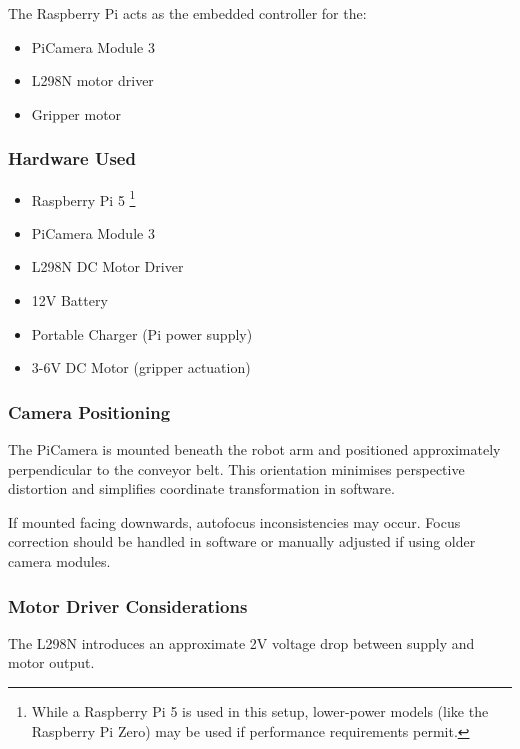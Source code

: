 \documentclass{ol-softwaremanual}
\begin{document}
The Raspberry Pi acts as the embedded controller for the:
\begin{itemize}
    \item PiCamera Module 3
    \item L298N motor driver
    \item Gripper motor
\end{itemize}

\subsubsection{Hardware Used}

\begin{itemize}
    \item Raspberry Pi 5
        \footnote{While a Raspberry Pi 5 is used in this setup, lower-power models (like the Raspberry Pi Zero) may be used if performance requirements permit.}
    \item PiCamera Module 3
    \item L298N DC Motor Driver
    \item 12V Battery
    \item Portable Charger (Pi power supply)
    \item 3-6V DC Motor (gripper actuation)
\end{itemize}

\subsubsection{Camera Positioning}

The PiCamera is mounted beneath the robot arm and positioned approximately perpendicular to the conveyor belt. This orientation minimises perspective distortion and simplifies coordinate transformation in software.

If mounted facing downwards, autofocus inconsistencies may occur. Focus correction should be handled in software or manually adjusted if using older camera modules.

\subsubsection{Motor Driver Considerations}

The L298N introduces an approximate 2V voltage drop between supply and motor output.
\end{document}

